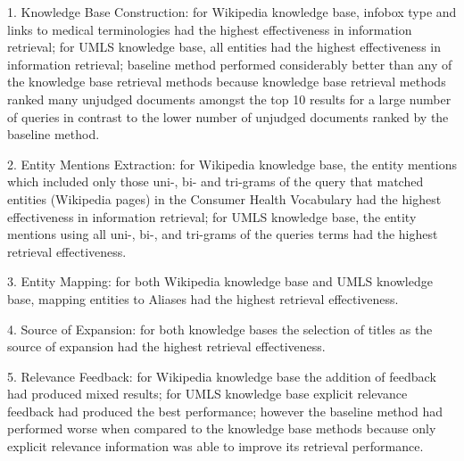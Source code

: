 \documentclass[]{article}
\begin{document}
1. Knowledge Base Construction: for Wikipedia knowledge base, infobox type and links to medical terminologies had the highest effectiveness in information retrieval; for UMLS knowledge base, all entities had the highest effectiveness in information retrieval; baseline method performed considerably better than any of the knowledge base retrieval methods because  knowledge base retrieval methods ranked many unjudged documents amongst the top 10 results for a large number of queries in contrast to the lower number of unjudged documents ranked by the baseline method.

2. Entity Mentions Extraction: for Wikipedia knowledge base, the entity mentions which included only those uni-, bi- and tri-grams of the query that
matched entities (Wikipedia pages) in the Consumer Health Vocabulary had the highest effectiveness in information retrieval; for UMLS knowledge base, the entity mentions using all uni-, bi-, and tri-grams of the queries terms had the highest retrieval effectiveness.

3. Entity Mapping: for both Wikipedia knowledge base and UMLS knowledge base, mapping entities to Aliases had the highest retrieval effectiveness. 

4. Source of Expansion: for both knowledge bases the selection of titles as the source of expansion had the highest retrieval effectiveness. 

5. Relevance Feedback: for Wikipedia knowledge base the addition of feedback had produced mixed results; for UMLS knowledge base explicit relevance feedback had produced the best performance; however the baseline method had performed worse when compared to the knowledge base methods because only explicit relevance information was able to improve its retrieval performance.  
\end{document}

